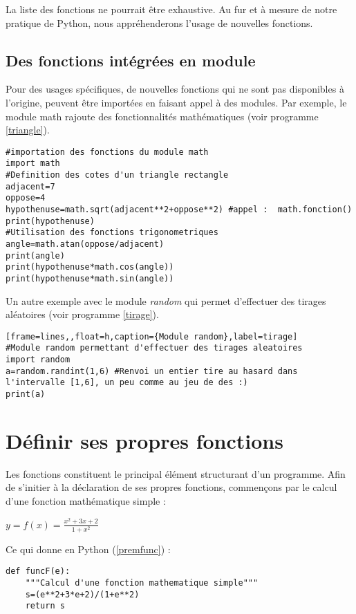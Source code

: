 La liste des fonctions ne pourrait être exhaustive. Au fur et à mesure de notre pratique de Python, nous appréhenderons l'usage de nouvelles fonctions. 


\subsection{Des fonctions intégrées en module}

Pour des usages spécifiques, de nouvelles fonctions qui ne sont pas disponibles à l'origine, peuvent être importées en faisant appel à des modules. Par exemple, le module math rajoute des fonctionnalités mathématiques (voir programme \ref{triangle}).

\begin{lstlisting}[frame=lines,float=h,caption={Module math},label=triangle]
#importation des fonctions du module math
import math 
#Definition des cotes d'un triangle rectangle
adjacent=7
oppose=4
hypothenuse=math.sqrt(adjacent**2+oppose**2) #appel :  math.fonction()
print(hypothenuse)
#Utilisation des fonctions trigonometriques
angle=math.atan(oppose/adjacent)
print(angle)
print(hypothenuse*math.cos(angle))
print(hypothenuse*math.sin(angle))
\end{lstlisting}

Un autre exemple avec le module \textit{random} qui permet d'effectuer des tirages aléatoires (voir programme \ref{tirage}).

\begin{lstlisting}[frame=lines,,float=h,caption={Module random},label=tirage]
#Module random permettant d'effectuer des tirages aleatoires
import random
a=random.randint(1,6) #Renvoi un entier tire au hasard dans l'intervalle [1,6], un peu comme au jeu de des :)
print(a)
\end{lstlisting}

\newpage

\section{Définir ses propres fonctions}

Les fonctions constituent le principal élément structurant d'un programme. Afin de s'initier à la déclaration de ses propres fonctions, commençons par le calcul d'une fonction mathématique simple :
\begin{center}
$y=f(x)=\frac{x^2+3x+2}{1+x^2}$
\end{center}

Ce qui donne en Python (\ref{premfunc}) :
\begin{lstlisting}[frame=lines,caption={Une première fonction},label=premfunc]
def funcF(e):
	"""Calcul d'une fonction mathematique simple"""
	s=(e**2+3*e+2)/(1+e**2)
	return s
\end{lstlisting}

